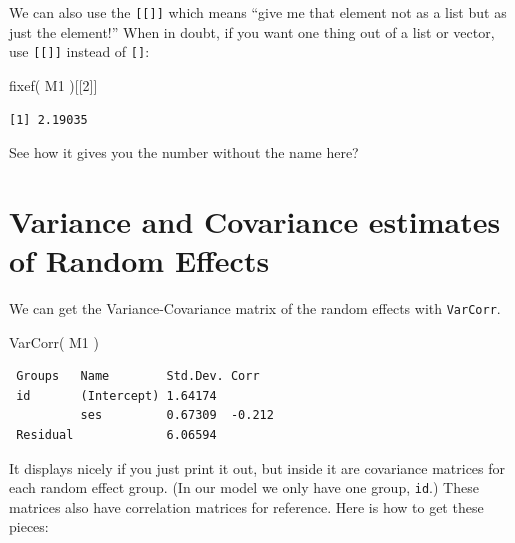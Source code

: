 \documentclass[
  letterpaper,
  DIV=11,
  numbers=noendperiod]{scrreprt}
\newenvironment{Shaded}{\begin{snugshade}}{\end{snugshade}}
\newcommand{\DecValTok}[1]{\textcolor[rgb]{0.25,0.63,0.44}{#1}}
\newcommand{\FunctionTok}[1]{\textcolor[rgb]{0.02,0.16,0.49}{#1}}
\newcommand{\NormalTok}[1]{\textcolor[rgb]{0.00,0.44,0.13}{#1}}
\newcommand{\OtherTok}[1]{\textcolor[rgb]{0.00,0.44,0.13}{#1}}
\newcommand{\SpecialCharTok}[1]{\textcolor[rgb]{0.25,0.44,0.63}{#1}}
\begin{document}
We can also use the \texttt{{[}{[}{]}{]}} which means ``give me that
element not as a list but as just the element!'' When in doubt, if you
want one thing out of a list or vector, use \texttt{{[}{[}{]}{]}}
instead of \texttt{{[}{]}}:

\begin{Shaded}
\begin{Highlighting}[]
\FunctionTok{fixef}\NormalTok{( M1 )[[}\DecValTok{2}\NormalTok{]]}
\end{Highlighting}
\end{Shaded}

\begin{verbatim}
[1] 2.19035
\end{verbatim}

See how it gives you the number without the name here?

\hypertarget{variance-and-covariance-estimates-of-random-effects}{%
\section{Variance and Covariance estimates of Random
Effects}\label{variance-and-covariance-estimates-of-random-effects}}

We can get the Variance-Covariance matrix of the random effects with
\texttt{VarCorr}.

\begin{Shaded}
\begin{Highlighting}[]
\FunctionTok{VarCorr}\NormalTok{( M1 )}
\end{Highlighting}
\end{Shaded}

\begin{verbatim}
 Groups   Name        Std.Dev. Corr  
 id       (Intercept) 1.64174        
          ses         0.67309  -0.212
 Residual             6.06594        
\end{verbatim}

It displays nicely if you just print it out, but inside it are
covariance matrices for each random effect group. (In our model we only
have one group, \texttt{id}.) These matrices also have correlation
matrices for reference. Here is how to get these pieces:

\begin{Shaded}
\end{Shaded}
\end{document}
